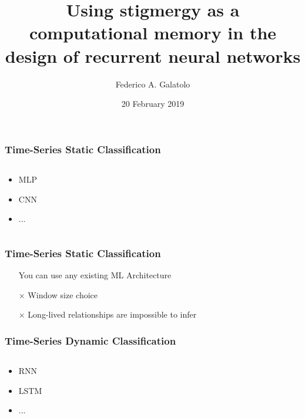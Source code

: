 \documentclass{beamer}
\title{Using stigmergy as a computational memory in the design of recurrent neural networks}
\author{Federico A. Galatolo}
\date{20 February 2019}
\begin{document}
\maketitle

\begin{frame}
    \frametitle{Time-Series Static Classification}
    \begin{columns}
        \begin{column}{0.2\textwidth}
            \begin{itemize}
                \item MLP
                \item CNN
                \item ...
            \end{itemize}
        \end{column}
        \begin{column}{0.8\textwidth}
            
        \end{column}
    \end{columns}
\end{frame}

\begin{frame}
    \frametitle{Time-Series Static Classification}
    \begin{itemize}
        \item[\checkmark] You can use any existing ML Architecture
        \item[$\times$] Window size choice
        \item[$\times$] Long-lived relationships are impossible to infer 
    \end{itemize} 
\end{frame}


\begin{frame}
    \frametitle{Time-Series Dynamic Classification}
    \begin{columns}
        \begin{column}{0.2\textwidth}
            \begin{itemize}
                \item RNN
                \item LSTM
                \item ...
            \end{itemize}
        \end{column}
        \begin{column}{0.8\textwidth}
            
        \end{column}
    \end{columns}
\end{frame}
\end{document}
